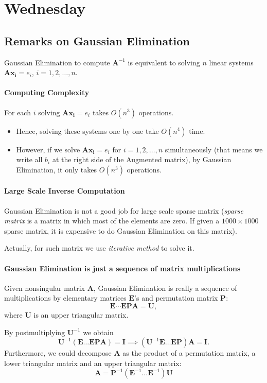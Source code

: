 

\section{Wednesday}
\subsection{Remarks on Gaussian Elimination}
Gaussian Elimination to compute $\bm A^{-1}$ is equivalent to solving $n$ linear systems $\bm{Ax_{i}} =e_i$, $i=1,2,\dots,n$.
\paragraph{Computing Complexity}
For each $i$ solving $\bm{Ax_i} = e_i$ takes $O(n^3)$ operations.
\begin{itemize}
\item
Hence, solving these systems one by one take $O(n^4)$ time.
\item
However, if we solve $\bm{Ax_i} = e_i$ for $i=1,2,\dots,n$ simultaneously (that means we write all $b_i$ at the right side of the Augmented matrix), by Gaussian Elimination, it only takes  $O(n^3)$ operations.
\end{itemize}
\paragraph{Large Scale Inverse Computation}
Gaussian Elimination is not a good job for large scale sparse matrix (\emph{sparse matrix} is a matrix in which most of the elements are zero. If given a $1000\times 1000$ sparse matrix, it is expensive to do Gaussian Elimination on this matrix).

Actually, for such matrix we use \textit{iterative method} to solve it.
\paragraph{Gaussian Elimination is just a sequence of matrix multiplications}
Given nonsingular matrix $\bm A$, Gaussian Elimination is really a sequence of multiplications by elementary matrices $\bm E$'s and permutation matrix $\bm P$:
\[
\bm E\cdots\bm E\bm P \bm A= \bm U,
\]
where $\bm U$ is an upper triangular matrix.

By postmultiplying $\bm U^{-1}$ we obtain 
\[
\bm U^{-1}(\bm E\ldots\bm E\bm P \bm A) = \bm I
\implies (\bm U^{-1}\bm E\ldots\bm E\bm P )\bm A = \bm I.
\]
Furthermore, we could decompose $\bm A$ as the product of a permutation matrix, a lower triangular matrix and an upper triangular matrix:
\[
\bm A = \bm P^{-1}(\bm E^{-1}\ldots\bm E^{-1})\bm U
\]
